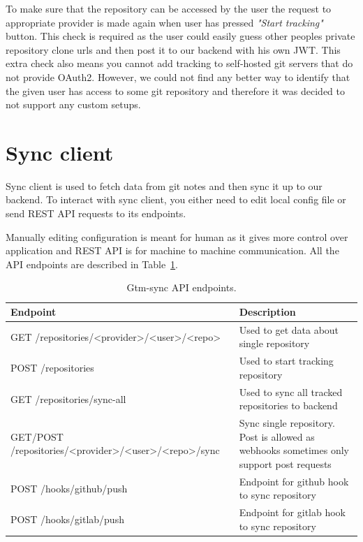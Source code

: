 To make sure that the repository can be accessed by the user the request to appropriate provider is made again
when user has pressed \textit{"Start tracking"} button.
This check is required as the user could easily guess other peoples private repository clone urls and then post
it to our backend with his own JWT.
This extra check also means you cannot add tracking to self-hosted git servers that do not provide OAuth2.
However, we could not find any better way to identify that the given user has access to some git repository and
therefore it was decided to not support any custom setups.

\section{Sync client}\label{sec:sync-client-content}
Sync client is used to fetch data from git notes and then sync it up to our backend.
To interact with sync client, you either need to edit local config file or send REST API requests to its endpoints.

Manually editing configuration is meant for human as it gives more control over application and REST API is
for machine to machine communication.
All the API endpoints are described in Table~\ref{tab:gtm-sync-endpoints}.

\begin{table}[H]
    \centering
    \begin{tabular}{ | p{6cm} | p{6cm} |}
        \hline
        Endpoint & Description\\
        \hline
        GET /repositories/<provider>/<user>/<repo> & Used to get data about single repository \\
        \hline
        POST /repositories & Used to start tracking repository\\
        \hline
        GET /repositories/sync-all & Used to sync all tracked repositories to backend\\
        \hline
        GET/POST /repositories/<provider>/<user>/<repo>/sync & Sync single repository.
        Post is allowed as webhooks sometimes only support post requests\\
        \hline
        POST /hooks/github/push & Endpoint for github hook to sync repository\\
        \hline
        POST /hooks/gitlab/push & Endpoint for gitlab hook to sync repository\\
        \hline
    \end{tabular}
    \caption{Gtm-sync API endpoints.}
    \label{tab:gtm-sync-endpoints}
\end{table}

